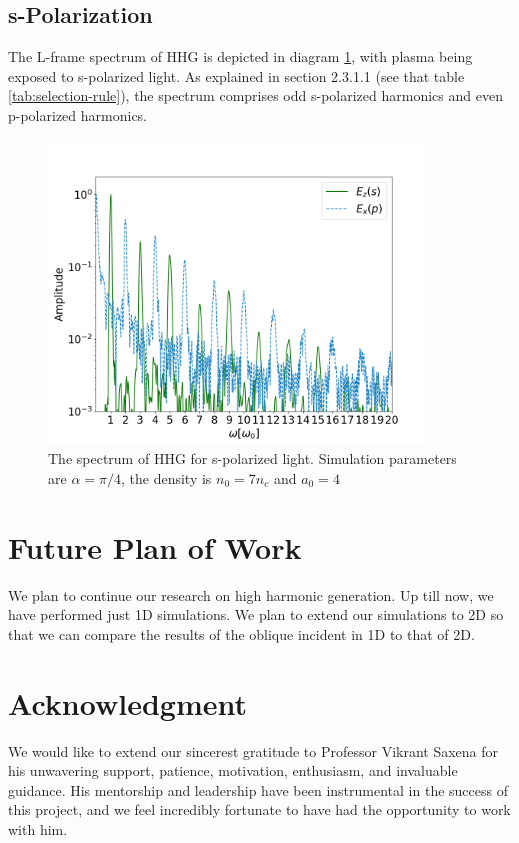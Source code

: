 \documentclass[12pt]{article}
\begin{document}
\subsection{s-Polarization}
The L-frame spectrum of HHG is depicted in diagram \ref{fig:s-fft}, with plasma being exposed to s-polarized light. As explained in section 2.3.1.1 (see that table \ref{tab:selection-rule}), the spectrum comprises odd s-polarized harmonics and even p-polarized harmonics.
\begin{figure}[h]
    \centering
    \includegraphics[width=0.9\textwidth]{images/s_fft.png}
    \caption{The spectrum of HHG for s-polarized light. Simulation parameters are $\alpha = \pi/4$, the density is $n_0 = 7n_c$ and $a_0 = 4$}
    \label{fig:s-fft}
\end{figure}

\section{Future Plan of Work}
We plan to continue our research on high harmonic generation. Up till now, we have performed just 1D simulations. We plan to extend our simulations to 2D so that we can compare the results of the oblique incident in 1D to that of 2D.

\section{Acknowledgment}
We would like to extend our sincerest gratitude to Professor Vikrant Saxena for his unwavering support, patience, motivation, enthusiasm, and invaluable guidance. His mentorship and leadership have been instrumental in the success of this project, and we feel incredibly fortunate to have had the opportunity to work with him.
\newpage
\printbibliography
\end{document}
